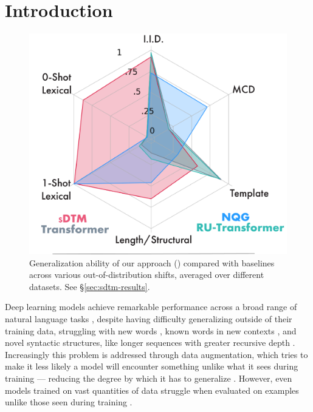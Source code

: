 \section{Introduction}

\begin{figure}
    \centering
    \vspace{-5.2em}
    \includegraphics[width=\linewidth]{images/sdtm/tight_radar/radar_integrated_legend.png}
    \caption{Generalization ability of our approach (\sdtm) compared with baselines across various out-of-distribution shifts, averaged over different datasets. See \S \ref{sec:sdtm-results}.}
    \label{fig:enter-label}
    \vspace{-1.5em}
\end{figure}


Deep learning models achieve remarkable performance across a broad range of natural language tasks \citep{vaswani2017attention}, despite having difficulty generalizing outside of their training data, struggling with new words \citep{Lake_2018_GeneralizationSystematicityCompositional}, known words in new contexts \citep{keysers2020measuring}, and novel syntactic structures, like longer sequences with greater recursive depth \citep{kim-linzen-2020-cogs, li_slog_2023}. Increasingly this problem is addressed through data augmentation, which tries to make it less likely a model will encounter something unlike what it sees during training --- reducing the degree by which it has to generalize \citep{andreas_good-enough_2020, devlin_bert_2019,  guo_sequence-level_2020}. However, even models trained on vast quantities of data struggle when evaluated on examples unlike those seen during training \citep{kim2022uncontrolled}.


